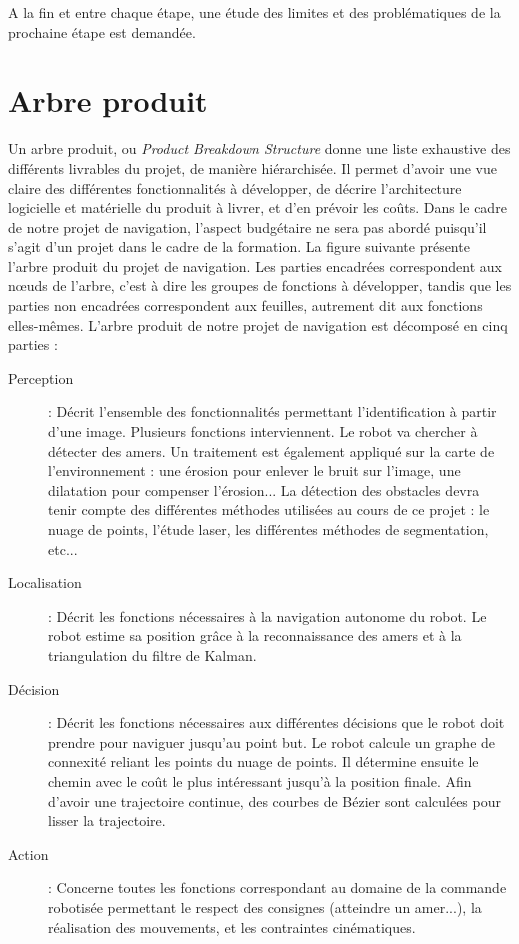 \documentclass[10pt,a4paper]{article}
\begin{document}
A la fin et entre chaque étape, une étude des limites et des problématiques de la prochaine étape est demandée.


\newpage
\section{Arbre produit}

Un arbre produit, ou \textit{Product Breakdown Structure} donne une liste exhaustive des différents livrables du projet, de manière hiérarchisée. Il permet d’avoir une vue claire des différentes fonctionnalités à développer, de décrire l’architecture logicielle et matérielle du produit à livrer, et d’en prévoir les coûts. Dans le cadre de notre projet de navigation, l’aspect budgétaire ne sera pas abordé puisqu’il s’agit d’un projet dans le cadre de la formation.
La figure suivante présente l’arbre produit du projet de navigation. Les parties encadrées correspondent aux nœuds de l'arbre, c’est à dire les groupes de fonctions à développer, tandis que les parties non encadrées correspondent aux feuilles, autrement dit aux fonctions elles-mêmes.
L’arbre produit de notre projet de navigation est décomposé en cinq parties :

\begin{description}
\item  [Perception] : Décrit l’ensemble des fonctionnalités permettant l’identification à partir d’une image. Plusieurs fonctions interviennent. Le robot va chercher à détecter des amers. Un traitement est également appliqué sur la carte de l'environnement : une érosion pour enlever le bruit sur l'image, une dilatation pour compenser l'érosion...
La détection des obstacles devra tenir compte des différentes méthodes utilisées au cours de ce projet : le nuage de points, l’étude laser, les différentes méthodes de segmentation, etc...
\item [Localisation] : Décrit les fonctions nécessaires à la navigation autonome du robot. Le robot estime sa position grâce à la reconnaissance des amers et à la triangulation du filtre de Kalman.
\item [Décision] : Décrit les fonctions nécessaires aux différentes décisions que le robot doit prendre pour naviguer jusqu'au point but. Le robot calcule un graphe de connexité reliant les points du nuage de points. Il détermine ensuite le chemin avec le coût le plus intéressant jusqu'à la position finale. Afin d'avoir une trajectoire continue, des courbes de Bézier sont calculées pour lisser la trajectoire.
\item [Action] : Concerne toutes les fonctions correspondant au domaine de la commande robotisée permettant le respect des consignes (atteindre un amer...), la réalisation des mouvements, et les contraintes cinématiques.
\end{description}
\end{document}
